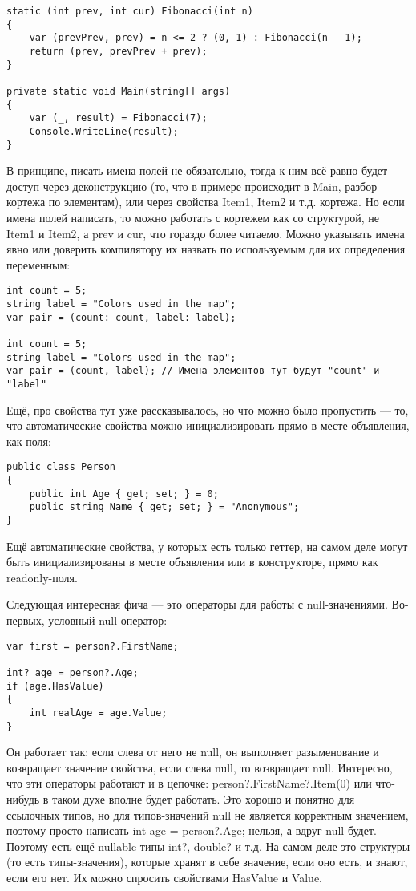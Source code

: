 \documentclass[a5paper]{article}
\begin{document}
\begin{verbatim}
static (int prev, int cur) Fibonacci(int n)
{
    var (prevPrev, prev) = n <= 2 ? (0, 1) : Fibonacci(n - 1);
    return (prev, prevPrev + prev);
}

private static void Main(string[] args)
{
    var (_, result) = Fibonacci(7);
    Console.WriteLine(result);
}
\end{verbatim}

В принципе, писать имена полей не обязательно, тогда к ним всё равно будет доступ через деконструкцию (то, что в примере происходит в Main, разбор кортежа по элементам), или через свойства Item1, Item2 и т.д. кортежа. Но если имена полей написать, то можно работать с кортежем как со структурой, не Item1 и Item2, а prev и cur, что гораздо более читаемо. Можно указывать имена явно или доверить компилятору их назвать по используемым для их определения переменным:

\begin{verbatim}
int count = 5;
string label = "Colors used in the map";
var pair = (count: count, label: label);

int count = 5;
string label = "Colors used in the map";
var pair = (count, label); // Имена элементов тут будут "count" и "label"
\end{verbatim}

Ещё, про свойства тут уже рассказывалось, но что можно было пропустить --- то, что автоматические свойства можно инициализировать прямо в месте объявления, как поля:

\begin{verbatim}
public class Person
{
    public int Age { get; set; } = 0;
    public string Name { get; set; } = "Anonymous";
}
\end{verbatim}

Ещё автоматические свойства, у которых есть только геттер, на самом деле могут быть инициализированы в месте объявления или в конструкторе, прямо как readonly-поля.

Следующая интересная фича --- это операторы для работы с null-значениями. Во-первых, условный null-оператор:

\begin{verbatim}
var first = person?.FirstName;

int? age = person?.Age;
if (age.HasValue)
{
    int realAge = age.Value;
}
\end{verbatim}

Он работает так: если слева от него не null, он выполняет разыменование и возвращает значение свойства, если слева null, то возвращает null. Интересно, что эти операторы работают и в цепочке: person?.FirstName?.Item(0) или что-нибудь в таком духе вполне будет работать. Это хорошо и понятно для ссылочных типов, но для типов-значений null не является корректным значением, поэтому просто написать int age = person?.Age; нельзя, а вдруг null будет. Поэтому есть ещё nullable-типы int?, double? и т.д. На самом деле это структуры (то есть типы-значения), которые хранят в себе значение, если оно есть, и знают, если его нет. Их можно спросить свойствами HasValue и Value.
\end{document}
